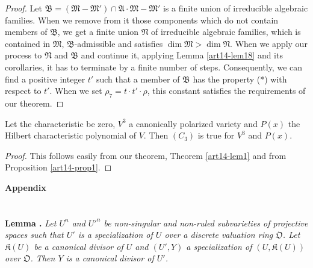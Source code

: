 \begin{proof}
Let $\mathfrak{B}=(\mathfrak{M}-\mathfrak{M}')\cap \mathfrak{A}\cdot \mathfrak{M}-\mathfrak{M}'$ is a finite union of irreducible algebraic families. When we remove from it those components which do not contain members of $\mathfrak{B}$, we get a finite union $\mathfrak{N}$ of irreducible algebraic families, which is contained in $\mathfrak{M}$, $\mathfrak{B}$-admissible and satisfies $\dim \mathfrak{M}>\dim \mathfrak{N}$. When we apply our process to $\mathfrak{N}$ and $\mathfrak{B}$ and continue it, applying Lemma \ref{art14-lem18} and its corollaries, it has to terminate by a finite number of steps. Consequently, we can find a positive integer $t'$ such that a member of $\mathfrak{B}$ has the property (*) with respect to $t'$. When we set $\rho_{7}=t\cdot t'\cdot \rho$, this constant satisfies the requirements of our theorem.
\end{proof}

\begin{coro*}
Let the characteristic be zero, $V^{3}$ a canonically polarized variety and $P(x)$ the Hilbert characteristic polynomial of $V$. Then $(C_{3})$ is true for $V^{3}$ and $P(x)$.
\end{coro*}

\begin{proof}
This follows easily from our theorem, Theorem \ref{art14-lem1} and from Proposition \ref{art14-prop1}.
\end{proof}

\bigskip

\begin{center}
{\Large\bf Appendix}
\end{center}

\setcounter{section}{0}
\section{}\label{art14-app-sec1}

\noindent
{\bf Lemma .\label{art14-app-lem1.1}}
{\em Let $U^{n}$ and ${U'}^{n}$ be non-singular and non-ruled subvarieties of projective spaces such that $U'$ is a specialization of $U$ over a discrete valuation ring $\mathfrak{O}$. Let $\mathfrak{K}(U)$ be a canonical divisor of $U$ and $(U',Y)$ a specialization of $(U,\mathfrak{K}(U))$ over $\mathfrak{O}$. Then $Y$ is a canonical divisor of $U'$.}

